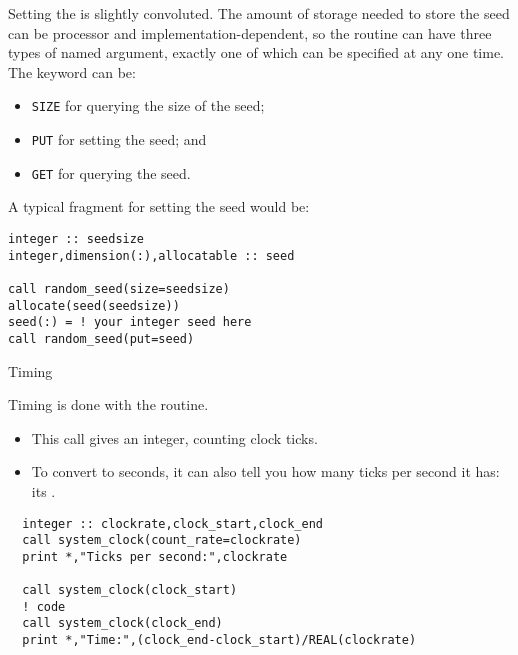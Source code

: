 Setting the  is slightly convoluted. The
amount of storage needed to store the seed can be processor and
implementation-dependent, so the routine 
can have three types of named argument, exactly one of which can be
specified at any one time. The keyword can be:
\begin{itemize}
\item \lstinline{SIZE} for querying the size of the seed;
\item \lstinline{PUT} for setting the seed; and
\item \lstinline{GET} for querying the seed.
\end{itemize}
A typical fragment for setting the seed would be:
\begin{lstlisting}
integer :: seedsize
integer,dimension(:),allocatable :: seed

call random_seed(size=seedsize)
allocate(seed(seedsize))
seed(:) = ! your integer seed here
call random_seed(put=seed)
\end{lstlisting}

 {Timing}

Timing is done with the  routine.
\begin{itemize}
\item This call gives an integer, counting clock ticks.
\item To convert to seconds, it can also tell you how many ticks per
  second it has: its .
\end{itemize}

\begin{lstlisting}
  integer :: clockrate,clock_start,clock_end
  call system_clock(count_rate=clockrate)
  print *,"Ticks per second:",clockrate

  call system_clock(clock_start)
  ! code
  call system_clock(clock_end)
  print *,"Time:",(clock_end-clock_start)/REAL(clockrate)
\end{lstlisting}
